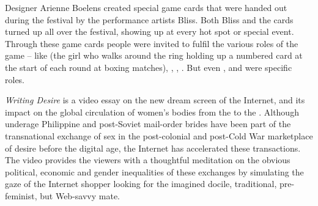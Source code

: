 {{Designer Arienne Boelens created special game cards that were handed out
during the festival by the performance artists Bliss. Both Bliss and
the cards turned up all over the festival, showing up at every hot spot
or special event. Through these game cards people were invited to
fulfil the various roles of the game {--} like  (the girl
who walks around the ring holding up a numbered card at the start of
each round at boxing matches), ,
, . But even , and
 were specific roles.


\blank
{\em Writing Desire} is a video essay on the new dream screen of the
Internet, and its impact on the global circulation of
women's bodies from the  to the {.} Although underage Philippine  and post{}-Soviet
mail{}-order brides have been part of the transnational exchange of sex
in the post{}-colonial and post{}-Cold War marketplace of desire before
the digital age, the Internet has accelerated these transactions. The
video provides the viewers with a thoughtful meditation on the obvious
political, economic and gender inequalities of these exchanges by
simulating the gaze of the Internet shopper looking for the imagined
docile, traditional, pre{}-feminist, but Web{}-savvy mate.
\blank
{}

}
}

